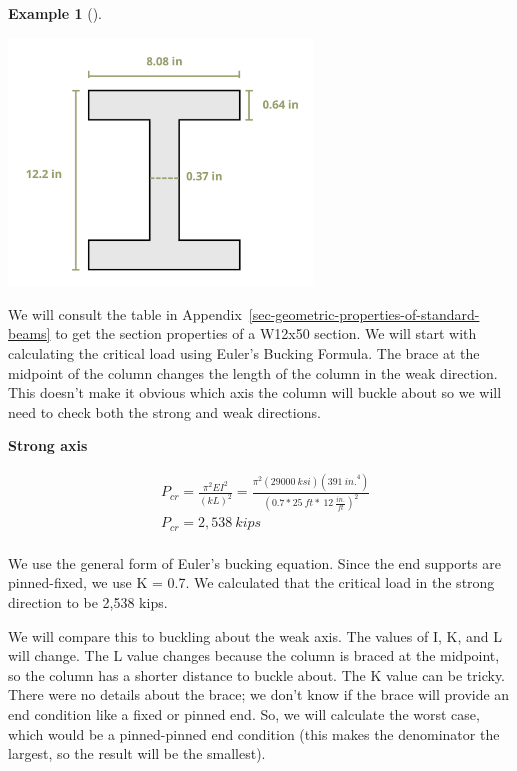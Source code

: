 \documentclass[
  letterpaper,
  DIV=11,
  numbers=noendperiod]{scrreprt}
\theoremstyle{definition}
\newtheorem{example}{Example}[chapter]
\theoremstyle{remark}
\begin{document}
\begin{tcolorbox}
\begin{example}[]
\begin{tcolorbox}
\begin{center}
\includegraphics[width=3.17708in,height=\textheight]{images/CH15s PNGs/example 15.3 copy.png}
\end{center}

We will consult the table in
Appendix~\ref{sec-geometric-properties-of-standard-beams} to get the
section properties of a W12x50 section. We will start with calculating
the critical load using Euler's Bucking Formula. The brace at the
midpoint of the column changes the length of the column in the weak
direction. This doesn't make it obvious which axis the column will
buckle about so we will need to check both the strong and weak
directions.

\textbf{Strong axis}

\[
\begin{aligned}
& P_{cr}=\frac{\pi^2 E I^2}{(k L)^2}=\frac{\pi^2(29000{~ksi})(391{~in.}^4)}{\left(0.7*25{~ft}*~12~\frac{in.}{ft}\right)^2} \\
& P_{c r}=2,538{~kips} \\
&
\end{aligned}
\]

We use the general form of Euler's bucking equation. Since the end
supports are pinned-fixed, we use K = 0.7. We calculated that the
critical load in the strong direction to be 2,538 kips.

We will compare this to buckling about the weak axis. The values of I,
K, and L will change. The L value changes because the column is braced
at the midpoint, so the column has a shorter distance to buckle about.
The K value can be tricky. There were no details about the brace; we
don't know if the brace will provide an end condition like a fixed or
pinned end. So, we will calculate the worst case, which would be a
pinned-pinned end condition (this makes the denominator the largest, so
the result will be the smallest).


\end{tcolorbox}
\end{example}
\end{tcolorbox}
\end{document}
